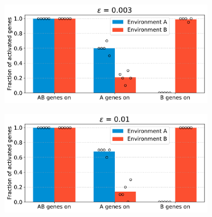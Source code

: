 \begin{figure}[H]
  \centering
  \begin{subfigure}[t]{0.49\textwidth}
    \includegraphics[width=\textwidth]{alife/img/mean_activation_epsilon-0.003.pdf}
    \label{subfig:alife:param_epsilon_1}
  \end{subfigure}
  \begin{subfigure}[t]{0.49\textwidth}
    \includegraphics[width=\textwidth]{alife/img/mean_activation_epsilon-0.01.pdf}
    \label{subfig:alife:param_epsilon_2}
  \end{subfigure}


\end{figure}
